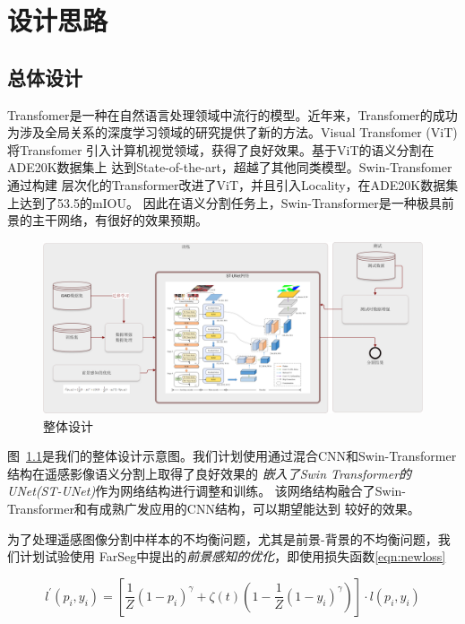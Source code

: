 \documentclass[a4paper,twoside,zihao=5,UTF8]{ctexrep}
\begin{document}
\part{设计思路}

\chapter{总体设计}
Transfomer是一种在自然语言处理领域中流行的模型。近年来，Transfomer的成功
为涉及全局关系的深度学习领域的研究提供了新的方法。Visual Transfomer (ViT)\cite{vit}将Transfomer
引入计算机视觉领域，获得了良好效果。基于ViT的语义分割\cite{segmenter}在ADE20K数据集上
达到State-of-the-art，超越了其他同类模型。Swin-Transfomer\cite{swin}通过构建
层次化的Transformer改进了ViT，并且引入Locality，在ADE20K数据集上达到了53.5的mIOU。
因此在语义分割任务上，Swin-Transformer是一种极具前景的主干网络，有很好的效果预期。

\begin{figure}[htbp]
    \includegraphics[width=\textwidth]{flowchart.png}
    \centering
    \caption{整体设计}
    \label{fig:fulldesign}
\end{figure}

图~\ref{fig:fulldesign}是我们的整体设计示意图。我们计划使用通过混合CNN和Swin-Transformer结构在遥感影像语义分割上取得了良好效果的
\emph{嵌入了Swin Transformer的UNet(ST-UNet)}\cite{stunet}作为网络结构进行调整和训练。
该网络结构融合了Swin-Transformer和有成熟广发应用的CNN结构，可以期望能达到
较好的效果。

为了处理遥感图像分割中样本的不均衡问题，尤其是前景-背景的不均衡问题，我们计划试验使用
FarSeg\cite{farseg}中提出的\emph{前景感知的优化}，即使用损失函数\eqref{eqn:newloss}

\begin{equation}
    \label{eqn:newloss}
    l^{'}(p_i,y_i)=[\frac{1}{Z}(1-p_i)^\gamma+\zeta (t)(1-\frac{1}{Z}(1-y_i)^\gamma)]\cdot l(p_i,y_i)
\end{equation}
\end{document}
